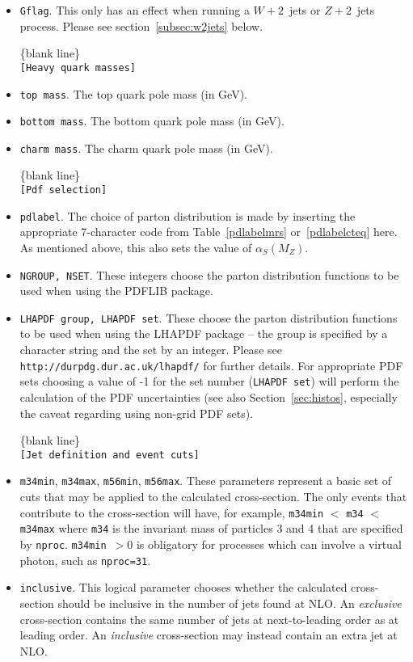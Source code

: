\documentclass[12pt]{article}
\begin{document}
\begin{itemize}
\item {\tt Gflag}. This only has an effect when running a
$W+2$~jets or $Z+2$~jets process. Please see section~\ref{subsec:w2jets}
below.

\begin{center}
\{blank line\} \\
{\tt [Heavy quark masses] }
\end{center}
\item {\tt top mass}. The top quark pole mass (in GeV).
\item {\tt bottom mass}. The bottom quark pole mass (in GeV).
\item {\tt charm mass}. The charm quark pole mass (in GeV).

\begin{center}
\{blank line\} \\
{\tt [Pdf selection] }
\end{center}

\item {\tt pdlabel}. The choice of parton distribution is made by
inserting the appropriate 7-character code from Table~\ref{pdlabelmrs}
or~\ref{pdlabelcteq} here.
As mentioned above, this also sets the value of $\alpha_S(M_Z)$.

\item {\tt NGROUP, NSET}. These integers choose the parton distribution
functions to be used when using the PDFLIB package.
\item {\tt LHAPDF group, LHAPDF set}. These choose the parton
distribution functions to be used when using the LHAPDF package --
the group is specified by a character string and the set by an integer.
Please see {\tt http://durpdg.dur.ac.uk/lhapdf/} for further details.
For appropriate PDF sets choosing a value of -1 for the set number ({\tt  LHAPDF set}) 
will perform the calculation of the PDF uncertainties (see also
Section~\ref{sec:histos}, especially the caveat regarding using
non-grid PDF sets).

\begin{center}
\{blank line\} \\
{\tt [Jet definition and event cuts] }
\end{center}

\item {\tt m34min}, {\tt m34max}, {\tt m56min}, {\tt m56max}.
These parameters represent a basic set of cuts that may be applied
to the calculated cross-section. The only events that contribute to
the cross-section will have, for example,
{\tt m34min} $<$ {\tt m34} $<$ {\tt m34max} where {\tt m34} is the
invariant mass of particles 3 and 4 that are specified by {\tt nproc}.
{\tt m34min}~$> 0$ is obligatory for processes which can involve a virtual
photon, such as {\tt nproc=31}.
\item {\tt inclusive}.  This logical parameter chooses whether the
calculated cross-section should be inclusive in the number of jets
found at NLO. An {\em exclusive}
cross-section contains the same number of jets at next-to-leading
order as at leading order. An {\em inclusive} cross-section may
instead contain an extra jet at NLO.


\end{itemize}
\end{document}
